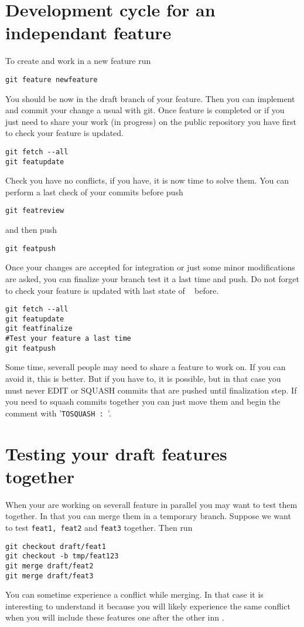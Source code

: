 \section{Development cycle for an independant feature}

To create and work in a new feature run
\begin{lstlisting}
git feature newfeature
\end{lstlisting}
You should be now in the draft branch of your feature. Then you can implement and commit your change a usual with git. Once feature is completed or if you just need to share your work (in progress) on the public repository you have first to check your feature is updated.
\begin{lstlisting}
git fetch --all
git featupdate
\end{lstlisting}
Check you have no conflicts, if you have, it is now time to solve them. You can perform a last check of your commits before push
\begin{lstlisting}
git featreview
\end{lstlisting}
and then push
\begin{lstlisting}
git featpush
\end{lstlisting}

Once your changes are accepted for integration or just some minor modifications are asked, you can finalize your branch test it a last time and push. Do not forget to check your feature is updated with last state of \DEVREF~ before.
\begin{lstlisting}
git fetch --all
git featupdate
git featfinalize
#Test your feature a last time
git featpush
\end{lstlisting}

Some time, severall people may need to share a feature to work on. If you can avoid it, this is better. But if you have to, it is possible, but in that case you must never EDIT or SQUASH commits that are pushed until finalization step. If you need to squash commits together you can just move them and begin the comment with '\texttt{TOSQUASH : }'.

\section{Testing your draft features together}

When your are working on severall feature in parallel you may want to test them together. In that you can merge them in a temporary branch. Suppose we want to test \texttt{feat1, feat2} and \texttt{feat3} together. Then run
\begin{lstlisting}
git checkout draft/feat1
git checkout -b tmp/feat123
git merge draft/feat2
git merge draft/feat3
\end{lstlisting}
You can sometime experience a conflict while merging. In that case it is interesting to understand it because you will likely experience the same conflict when you will include these features one after the other inn \DEVREF.

